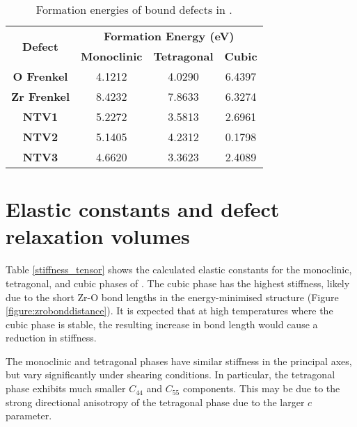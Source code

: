 \begin{table}[htp] %
\onehalfspacing
\centering
\caption{Formation energies of bound defects in \zirconia.}
\label{table:bound_defects}
\begin{tabular}{cccc}
\hline
\multirow{2}{*}{\textbf{Defect}} & \multicolumn{3}{c}{\textbf{Formation Energy (eV)}} \\ \cline{2-4} 
 & \textbf{Monoclinic} & \textbf{Tetragonal} & \textbf{Cubic} \\ \hline
\textbf{O Frenkel} & 4.1212 & 4.0290 & 6.4397 \\
\textbf{Zr Frenkel} & 8.4232 & 7.8633 & 6.3274 \\
\textbf{NTV1} & 5.2272 & 3.5813 & 2.6961 \\
\textbf{NTV2} & 5.1405 & 4.2312 & 0.1798 \\
\textbf{NTV3} & 4.6620 & 3.3623 & 2.4089 \\ \hline
\end{tabular}
\end{table}

\section{Elastic constants and defect relaxation volumes}

Table \ref{stiffness_tensor} shows the calculated elastic constants for the monoclinic, tetragonal, and cubic phases of \zirconia . The cubic phase has the highest stiffness, likely due to the short Zr-O bond lengths in the energy-minimised structure (Figure \ref{figure:zrobonddistance}). It is expected that at high temperatures where the cubic phase is stable, the resulting increase in bond length would cause a reduction in stiffness. 

The monoclinic and tetragonal phases have similar stiffness in the principal axes, but vary significantly under shearing conditions. In particular, the tetragonal phase exhibits much smaller $C_{44}$ and $C_{55}$ components. This may be due to the strong directional anisotropy of the tetragonal phase due to the larger $c$ parameter. 



